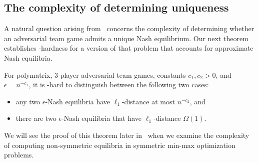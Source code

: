 \subsection{The complexity of determining uniqueness}

A natural question arising from~ concerns the complexity of determining whether an adversarial team game admits a unique Nash equilibrium. Our next theorem establishes \NP-hardness for a version of that problem that accounts for approximate Nash equilibria.

\begin{theorem}
    \label{theorem:uniqueATG}
    For polymatrix, $3$-player adversarial team games, constants $c_1, c_2 > 0$, and $\epsilon = n^{-c_1}$, it is \NP-hard to distinguish between the following two cases:
    \begin{itemize}[noitemsep,topsep=0pt]
        \item any two $\epsilon$-Nash equilibria have $\ell_1$-distance at most $n^{-c_2}$, and
        \item there are two $\epsilon$-Nash equilibria that have $\ell_1$-distance $\Omega(1)$.
    \end{itemize}
\end{theorem}

We will see the proof of this theorem later in~ when we examine the complexity of computing non-symmetric equilibria in symmetric min-max optimization problems.